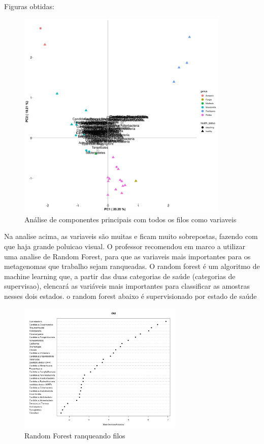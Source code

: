 \documentclass[12pt, a4paper]{report}
\begin{document}
Figuras obtidas:

\begin{figure}[!h]
  \centering 
  \includegraphics[width=0.9\textwidth]{figures/output_PCA_corais_2018_10_01.jpg}
  \caption{Análise de componentes principais com todos os filos como variaveis}
  \end{figure}

Na analise acima, as variaveis são muitas e ficam muito sobrepostas, fazendo com que haja grande poluicao visual. O professor recomendou em marco a utilizar uma analise de Random Forest, para que as variaveis mais importantes para os metagenomas que trabalho sejam ranqueadas. O random forest é um algoritmo de machine learning que, a partir das duas categorias de saúde (categorias de supervisao), elencará as variáveis mais importantes para classificar as amostras nesses dois estados. o random forest abaixo é supervisionado por estado de saúde \\

\begin{figure}[!h]
  \centering 
  \includegraphics[width=0.7\textwidth]{figures/randomforest_taxonomic_corais_2018_10_01.jpeg}
  \caption{Random Forest ranqueando filos}
  \end{figure}
\end{document}
